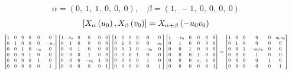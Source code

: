 \documentclass[11pt]{article}
\theoremstyle{definition}
\begin{document}
\[
\alpha = \left( 0, \  1, \  1, \  0, \  0, \  0\right), \quad \beta = \left( 1, \  -1, \  0, \  0, \  0, \  0\right)
\]
\[
\scaletoalign{\textwidth}{\left[ X_{\alpha}\left(u_{0}\right), X_{\beta}\left(v_{0}\right) \right] = X_{\alpha + \beta}\left(- u_{0} v_{0}\right)}
\]
\[
\scaletoalign{\textwidth}{{\left[\begin{matrix}1 & 0 & 0 & 0 & 0 & 0\\0 & 1 & 0 & 0 & 0 & - u_{0}\\0 & 0 & 1 & 0 & u_{0} & 0\\0 & 0 & 0 & 1 & 0 & 0\\0 & 0 & 0 & 0 & 1 & 0\\0 & 0 & 0 & 0 & 0 & 1\end{matrix}\right]} {\left[\begin{matrix}1 & v_{0} & 0 & 0 & 0 & 0\\0 & 1 & 0 & 0 & 0 & 0\\0 & 0 & 1 & 0 & 0 & 0\\0 & 0 & 0 & 1 & 0 & 0\\0 & 0 & 0 & - v_{0} & 1 & 0\\0 & 0 & 0 & 0 & 0 & 1\end{matrix}\right]} {\left[\begin{matrix}1 & 0 & 0 & 0 & 0 & 0\\0 & 1 & 0 & 0 & 0 & u_{0}\\0 & 0 & 1 & 0 & - u_{0} & 0\\0 & 0 & 0 & 1 & 0 & 0\\0 & 0 & 0 & 0 & 1 & 0\\0 & 0 & 0 & 0 & 0 & 1\end{matrix}\right]} {\left[\begin{matrix}1 & - v_{0} & 0 & 0 & 0 & 0\\0 & 1 & 0 & 0 & 0 & 0\\0 & 0 & 1 & 0 & 0 & 0\\0 & 0 & 0 & 1 & 0 & 0\\0 & 0 & 0 & v_{0} & 1 & 0\\0 & 0 & 0 & 0 & 0 & 1\end{matrix}\right]} = {\left[\begin{matrix}1 & 0 & 0 & 0 & 0 & u_{0} v_{0}\\0 & 1 & 0 & 0 & 0 & 0\\0 & 0 & 1 & - u_{0} v_{0} & 0 & 0\\0 & 0 & 0 & 1 & 0 & 0\\0 & 0 & 0 & 0 & 1 & 0\\0 & 0 & 0 & 0 & 0 & 1\end{matrix}\right]}}
\]
\end{document}
